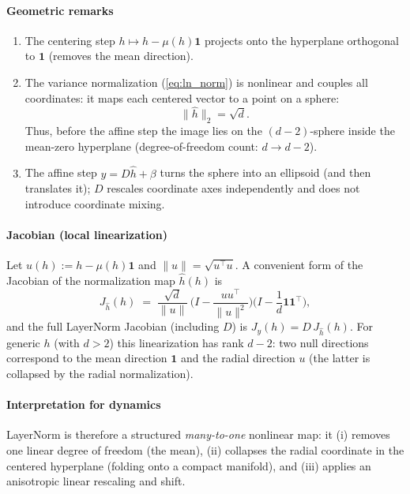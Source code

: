 \documentclass[a4paper,12pt]{article}
\begin{document}
\paragraph{Geometric remarks}
\begin{enumerate}
  \item The centering step \(h\mapsto h-\mu(h)\mathbf{1}\) projects onto the hyperplane orthogonal to \(\mathbf1\) (removes the mean direction).
  \item The variance normalization (\ref{eq:ln_norm}) is nonlinear and couples all coordinates: it maps each centered vector to a point on a sphere:
  \[
    \lVert \widehat{h}\rVert_2 = \sqrt{d}.
  \]
  Thus, before the affine step the image lies on the \((d-2)\)-sphere inside the mean-zero hyperplane (degree-of-freedom count: \(d\to d-2\)).
  \item The affine step \(y=D\widehat{h}+\beta\) turns the sphere into an ellipsoid (and then translates it); \(D\) rescales coordinate axes independently and does not introduce coordinate mixing.
\end{enumerate}

\paragraph{Jacobian (local linearization)}
Let \(u(h):=h-\mu(h)\mathbf1\) and \(\|u\|=\sqrt{u^\top u}\).  A convenient form of the Jacobian of the normalization map \(\widehat{h}(h)\) is
\[
J_{\widehat{h}}(h)
\;=\;
\frac{\sqrt{d}}{\|u\|}\,\Big(I - \frac{u u^\top}{\|u\|^2}\Big)\Big(I - \frac{1}{d}\mathbf1\mathbf1^\top\Big),
\]
and the full LayerNorm Jacobian (including \(D\)) is \(J_y(h)=D\,J_{\widehat{h}}(h)\).  For generic \(h\) (with \(d>2\)) this linearization has rank \(d-2\): two null directions correspond to the mean direction \(\mathbf1\) and the radial direction \(u\) (the latter is collapsed by the radial normalization).

\paragraph{Interpretation for dynamics}
LayerNorm is therefore a structured \emph{many-to-one} nonlinear map: it (i) removes one linear degree of freedom (the mean), (ii) collapses the radial coordinate in the centered hyperplane (folding onto a compact manifold), and (iii) applies an anisotropic linear rescaling and shift.
\end{document}
